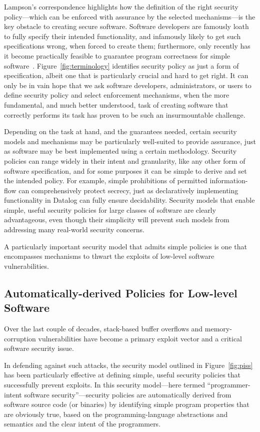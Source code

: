 \documentclass{IEEEtran}
\begin{document}
Lampson's correspondence highlights how the definition of the right security policy---which can be enforced with assurance by the selected mechanisms---is the key obstacle to creating secure software.
Software developers are famously loath to fully specify their intended functionality, and infamously likely to get such specifications wrong, when forced to create them; furthermore, only recently has it become practically feasible to guarantee program correctness for simple software~\cite{SeL4}.
Figure~\ref{fig:terminology} identifies security policy as just a form of specification,
albeit one that is particularly crucial and hard to get right.
It can only be in vain hope that we ask software developers, administrators, or users to define security policy and select enforcement mechanisms, 
when the more fundamental, and much better understood, task of creating software that correctly performs its task has proven to be such an insurmountable challenge.


Depending on the task at hand, and the guarantees needed, certain security models and mechanisms may be particularly well-suited to provide assurance, just as software may be best implemented using a certain methodology.
Security policies can range widely in their intent and granularity, 
like any other form of software specification,
and for some purposes it can be simple to derive and set the intended policy.
For example, 
simple prohibitions of permitted information-flow can comprehensively protect secrecy,
just as declaratively implementing functionality in Datalog can fully ensure decidability.
Security models that enable simple, useful security policies for large classes of software are clearly advantageous, even though their simplicity will prevent such models from addressing many real-world security concerns.


A particularly important 
security model that admits simple policies is one that encompasses mechanisms to thwart the exploits of low-level software vulnerabilities.


\subsection{Automatically-derived Policies for Low-level Software}
Over the last couple of decades, stack-based buffer overflows and memory-corruption vulnerabilities have become a primary exploit vector and a critical software security issue.


In defending against such attacks, the security model outlined in Figure~\ref{fig:piss} has been particularly effective at defining simple, useful security policies that successfully prevent exploits.
In this security model---here termed ``programmer-intent software security''---security policies are automatically derived from software source code (or binaries) by identifying simple program properties that are obviously true, based on the programming-language abstractions and semantics and the clear intent of the programmers.
\end{document}

